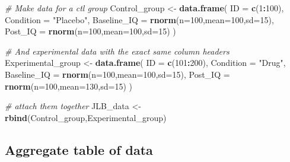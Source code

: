 \documentclass[
]{book}
\newenvironment{Shaded}{\begin{snugshade}}{\end{snugshade}}
\newcommand{\AttributeTok}[1]{\textcolor[rgb]{0.13,0.29,0.53}{#1}}
\newcommand{\CommentTok}[1]{\textcolor[rgb]{0.56,0.35,0.01}{\textit{#1}}}
\newcommand{\DecValTok}[1]{\textcolor[rgb]{0.00,0.00,0.81}{#1}}
\newcommand{\FunctionTok}[1]{\textcolor[rgb]{0.13,0.29,0.53}{\textbf{#1}}}
\newcommand{\NormalTok}[1]{#1}
\newcommand{\OtherTok}[1]{\textcolor[rgb]{0.56,0.35,0.01}{#1}}
\newcommand{\SpecialCharTok}[1]{\textcolor[rgb]{0.81,0.36,0.00}{\textbf{#1}}}
\newcommand{\StringTok}[1]{\textcolor[rgb]{0.31,0.60,0.02}{#1}}
\begin{document}
\begin{Shaded}
\begin{Highlighting}[]
\CommentTok{\# Make data for a ctl group}
\NormalTok{Control\_group }\OtherTok{\textless{}{-}} \FunctionTok{data.frame}\NormalTok{(}
  \AttributeTok{ID =} \FunctionTok{c}\NormalTok{(}\DecValTok{1}\SpecialCharTok{:}\DecValTok{100}\NormalTok{),}
  \AttributeTok{Condition =} \StringTok{"Placebo"}\NormalTok{,}
  \AttributeTok{Baseline\_IQ =} \FunctionTok{rnorm}\NormalTok{(}\AttributeTok{n=}\DecValTok{100}\NormalTok{,}\AttributeTok{mean=}\DecValTok{100}\NormalTok{,}\AttributeTok{sd=}\DecValTok{15}\NormalTok{),}
  \AttributeTok{Post\_IQ =} \FunctionTok{rnorm}\NormalTok{(}\AttributeTok{n=}\DecValTok{100}\NormalTok{,}\AttributeTok{mean=}\DecValTok{100}\NormalTok{,}\AttributeTok{sd=}\DecValTok{15}\NormalTok{)}
\NormalTok{)}

\CommentTok{\# And experimental data with the exact same column headers}
\NormalTok{Experimental\_group }\OtherTok{\textless{}{-}} \FunctionTok{data.frame}\NormalTok{(}
  \AttributeTok{ID =} \FunctionTok{c}\NormalTok{(}\DecValTok{101}\SpecialCharTok{:}\DecValTok{200}\NormalTok{),}
  \AttributeTok{Condition =} \StringTok{"Drug"}\NormalTok{,}
  \AttributeTok{Baseline\_IQ =} \FunctionTok{rnorm}\NormalTok{(}\AttributeTok{n=}\DecValTok{100}\NormalTok{,}\AttributeTok{mean=}\DecValTok{100}\NormalTok{,}\AttributeTok{sd=}\DecValTok{15}\NormalTok{),}
  \AttributeTok{Post\_IQ =} \FunctionTok{rnorm}\NormalTok{(}\AttributeTok{n=}\DecValTok{100}\NormalTok{,}\AttributeTok{mean=}\DecValTok{130}\NormalTok{,}\AttributeTok{sd=}\DecValTok{15}\NormalTok{)}
\NormalTok{)}

\CommentTok{\# attach them together}
\NormalTok{JLB\_data }\OtherTok{\textless{}{-}} \FunctionTok{rbind}\NormalTok{(Control\_group,Experimental\_group)}
\end{Highlighting}
\end{Shaded}

\subsection*{Aggregate table of data}\label{aggregate-table-of-data}
\end{document}
